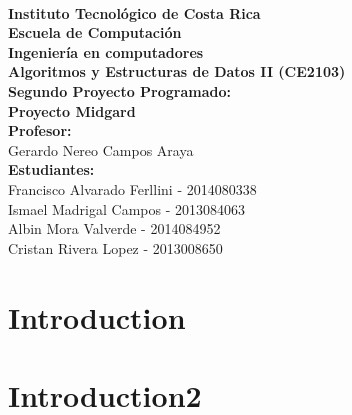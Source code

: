 \documentclass[showkeys,eqsecnum,prd,showpacs,notitlepage,12pt]{article}
\title{}%
\date{}%
\begin{document}

\setlength{\unitlength}{0,5 cm} %
\thispagestyle{empty}

\begin{center}
\textbf{}\\[4cm]
\textbf{{\Huge Instituto Tecnológico de Costa Rica}}\\[2cm]
\textbf{{\LARGE Escuela de Computación}}\\[1cm]
\textbf{{\LARGE Ingeniería en computadores}}\\[1cm]
\textbf{{\LARGE Algoritmos y Estructuras de Datos II (CE2103)}}\\[2,3cm]


{\LARGE \textbf{Segundo Proyecto Programado:}}\\[1cm]
{\LARGE \textbf{Proyecto  Midgard}}\\[2cm]

\textbf{{\large Profesor:  }}\\[0,2cm]
{\large Gerardo Nereo Campos Araya}\\[1cm]

\textbf{{\large Estudiantes: }}\\[0,2cm]
{\large Francisco Alvarado Ferllini - 2014080338}\\[0,3cm]
{\large Ismael Madrigal Campos - 2013084063}\\[0,3cm]
{\large Albin Mora Valverde - 2014084952}\\[0,3cm]
{\large Cristan Rivera Lopez - 2013008650}\\[0,3cm]

\end{center}

\maketitle

\section{Introduction}

\section{Introduction2}
\end{document}
